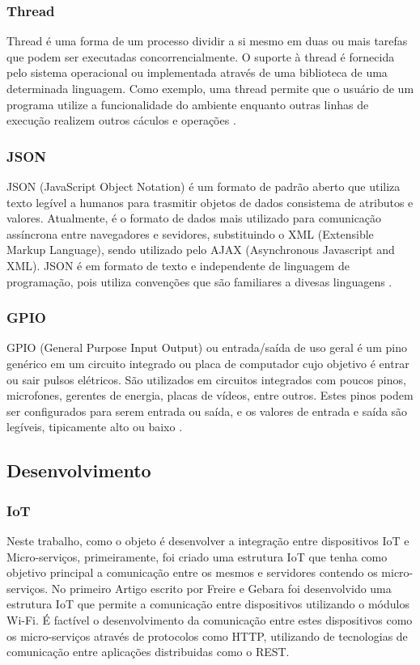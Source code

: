 \documentclass[journal]{IEEEtran}
\begin{document}
\subsubsection{Thread}
Thread é uma forma de um processo dividir a si mesmo em duas ou mais tarefas que podem ser executadas concorrencialmente. O suporte à thread é fornecida pelo sistema operacional ou implementada através de uma biblioteca de uma determinada linguagem. Como exemplo, uma thread permite que o usuário de um programa utilize a funcionalidade do ambiente enquanto outras linhas de execução realizem outros cáculos e operações \cite{tecmundothread}.

\subsubsection{JSON}
JSON (JavaScript Object Notation) é um formato de padrão aberto que utiliza texto legível a humanos para trasmitir objetos de dados consistema de atributos e valores. Atualmente, é o formato de dados mais utilizado para comunicação assíncrona entre navegadores e sevidores, substituindo o XML (Extensible Markup Language), sendo utilizado pelo AJAX (Asynchronous Javascript and XML). JSON é em formato de texto e independente de linguagem de programação, pois utiliza convenções que são familiares a divesas linguagens \cite{jsonpt}.

\subsubsection{GPIO}

GPIO (General Purpose Input Output) ou entrada/saída de uso geral é um pino genérico em um circuito integrado ou placa de computador cujo objetivo é entrar ou sair pulsos elétricos. São utilizados em circuitos integrados com poucos pinos, microfones, gerentes de energia, placas de vídeos, entre outros. Estes pinos podem ser configurados para serem entrada ou saída, e os valores de entrada e saída são legíveis, tipicamente alto ou baixo \cite[p.~3]{Sasang}.

\subsection{Desenvolvimento}
\subsubsection{IoT}

Neste trabalho, como o objeto é desenvolver a integração entre dispositivos IoT e Micro-serviços, primeiramente, foi criado uma estrutura IoT que tenha como objetivo principal a comunicação entre os mesmos e servidores contendo os micro-serviços. No primeiro Artigo escrito por Freire e Gebara \cite{freiregebaraiot} foi desenvolvido uma estrutura IoT que permite a comunicação entre dispositivos utilizando o módulos Wi-Fi. É factível o desenvolvimento da comunicação entre estes dispositivos como os micro-serviços através de protocolos como HTTP, utilizando de tecnologias de comunicação entre aplicações distribuidas como o REST.
\end{document}
